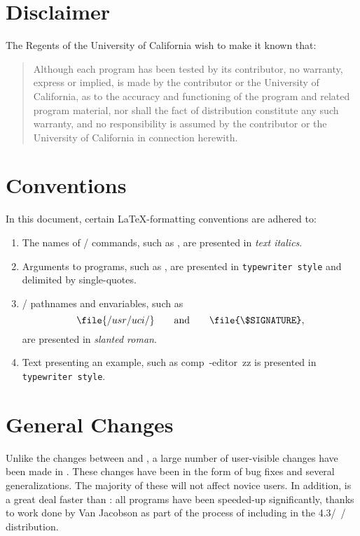 \section*	{Disclaimer}
The Regents of the University of California wish to make it known that:
\begin{quote}
Although each program has been tested by its contributor,
no warranty, express or implied,
is made by the contributor or the University of California,
as to the accuracy and functioning of the program
and related program material,
nor shall the fact of distribution constitute any such warranty,
and no responsibility is assumed by the contributor
or the University of California in connection herewith.
\end{quote}

\bop

\section*	{Conventions}
In this document,
certain \LaTeX -formatting conventions are adhered to:
\begin{enumerate}
\item	The names of \unix/ commands, such as ,
are presented in {\it text italics}.

\item	Arguments to programs, such as ,
are presented in {\tt typewriter style} and delimited by single-quotes.

\item	\unix/ pathnames and envariables,
such as $$\file{/usr/uci/}\hbox{\qquad and\qquad}\file{\$SIGNATURE},$$
are presented in {\sl slanted roman}.

\item	Text presenting an example, such as
\example comp\ -editor\ zz\endexample
is presented in {\tt typewriter style}.
\end{enumerate}

\bop

\section*	{General Changes}
Unlike the changes between  and ,
a large number of user-visible changes have been made in .
These changes have been in the form of bug fixes and several generalizations.
The majority of these will not affect novice users.
In addition,  is a great deal faster than :
all programs have been speeded-up significantly,
thanks to work done by Van Jacobson as part of the process of including 
in the 4.3\bsd/~\unix/ distribution.

